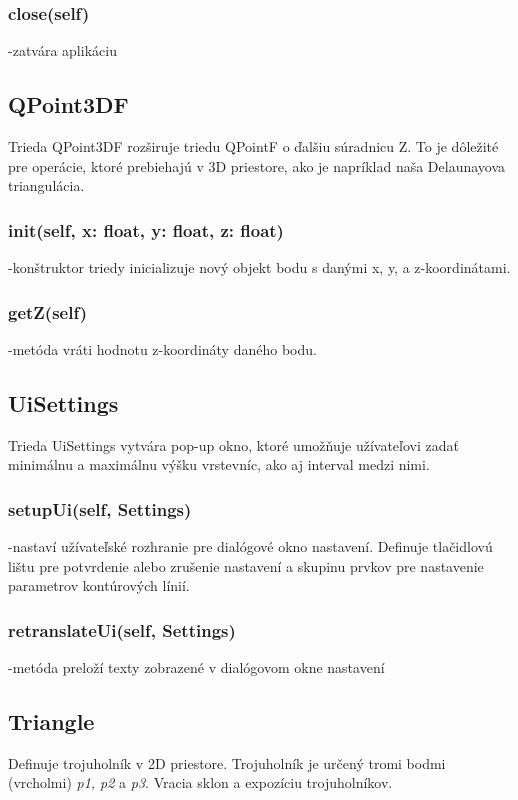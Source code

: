 \documentclass[12pt]{article}
\begin{document}
\subsubsection*{close(self)}
\noindent-zatvára aplikáciu

\subsection*{QPoint3DF}
Trieda QPoint3DF rozširuje triedu QPointF o ďalšiu súradnicu Z. To je dôležité pre operácie, ktoré prebiehajú v 3D priestore, ako je napríklad naša Delaunayova triangulácia.
\subsubsection*{\textunderscore \textunderscore init\textunderscore \textunderscore (self, x: float, y: float, z: float)}
\noindent-konštruktor triedy inicializuje nový objekt bodu s danými x, y, a z-koordinátami.

\subsubsection*{getZ(self)}
\noindent-metóda vráti hodnotu z-koordináty daného bodu.
\subsection*{ Ui\textunderscore Settings}
Trieda Ui\textunderscore Settings vytvára pop-up okno, ktoré umožňuje užívateľovi zadať minimálnu a maximálnu výšku vrstevníc, ako aj interval medzi nimi.
\subsubsection*{setupUi(self, Settings)}
\noindent-nastaví užívateľské rozhranie pre dialógové okno nastavení. Definuje tlačidlovú lištu pre potvrdenie alebo zrušenie nastavení a skupinu prvkov pre nastavenie parametrov kontúrových línií.
\subsubsection*{retranslateUi(self, Settings)}
\noindent-metóda preloží texty zobrazené v dialógovom okne nastavení
\subsection*{Triangle}
Definuje trojuholník v 2D priestore. Trojuholník je určený tromi bodmi (vrcholmi) \textit{p1, p2} a \textit{p3}. Vracia sklon a expozíciu trojuholníkov.
\end{document}
